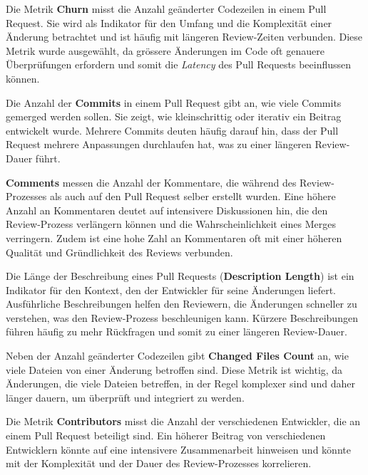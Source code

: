 Die Metrik \textbf{Churn} misst die Anzahl geänderter Codezeilen in einem Pull Request. Sie wird als Indikator für den Umfang und die Komplexität einer Änderung betrachtet und ist häufig mit längeren Review-Zeiten verbunden. Diese Metrik wurde ausgewählt, da grössere Änderungen im Code oft genauere Überprüfungen erfordern und somit die \textit{Latency} des Pull Requests beeinflussen können. \parencite{gousios_exploratory_2014}

Die Anzahl der \textbf{Commits} in einem Pull Request gibt an, wie viele Commits gemerged werden sollen. Sie zeigt, wie kleinschrittig oder iterativ ein Beitrag entwickelt wurde. Mehrere Commits deuten häufig darauf hin, dass der Pull Request mehrere Anpassungen durchlaufen hat, was zu einer längeren Review-Dauer führt. \parencite{zhang_pull_2022}

\textbf{Comments} messen die Anzahl der Kommentare, die während des Review-Prozesses als auch auf den Pull Request selber erstellt wurden. Eine höhere Anzahl an Kommentaren deutet auf intensivere Diskussionen hin, die den Review-Prozess verlängern können und die Wahrscheinlichkeit eines Merges verringern. Zudem ist eine hohe Zahl an Kommentaren oft mit einer höheren Qualität und Gründlichkeit des Reviews verbunden. \parencite{tsay_influence_2014}

Die Länge der Beschreibung eines Pull Requests (\textbf{Description Length}) ist ein Indikator für den Kontext, den der Entwickler für seine Änderungen liefert. Ausführliche Beschreibungen helfen den Reviewern, die Änderungen schneller zu verstehen, was den Review-Prozess beschleunigen kann. Kürzere Beschreibungen führen häufig zu mehr Rückfragen und somit zu einer längeren Review-Dauer. \parencite{zhang_pull_2022}

Neben der Anzahl geänderter Codezeilen gibt \textbf{Changed Files Count} an, wie viele Dateien von einer Änderung betroffen sind. Diese Metrik ist wichtig, da Änderungen, die viele Dateien betreffen, in der Regel komplexer sind und daher länger dauern, um überprüft und integriert zu werden. \parencite{tsay_influence_2014}

Die Metrik \textbf{Contributors} misst die Anzahl der verschiedenen Entwickler, die an einem Pull Request beteiligt sind. Ein höherer Beitrag von verschiedenen Entwicklern könnte auf eine intensivere Zusammenarbeit hinweisen und könnte mit der Komplexität und der Dauer des Review-Prozesses korrelieren.

\newpage  

